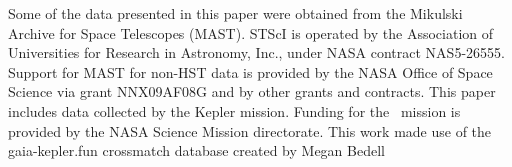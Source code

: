 Some of the data presented in this paper were obtained from the Mikulski
Archive for Space Telescopes (MAST).
STScI is operated by the Association of Universities for Research in
Astronomy, Inc., under NASA contract NAS5-26555.
Support for MAST for non-HST data is provided by the NASA Office of Space
Science via grant NNX09AF08G and by other grants and contracts.
This paper includes data collected by the Kepler mission. Funding for the
\Kepler\ mission is provided by the NASA Science Mission directorate.
This work made use of the gaia-kepler.fun crossmatch database created by Megan
Bedell

